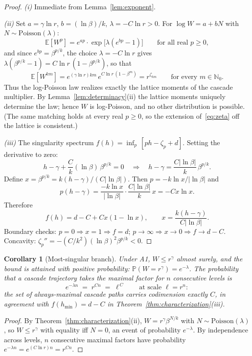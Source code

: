 \documentclass[pdflatex,sn-mathphys-num]{sn-jnl}
\theoremstyle{thmstyleone}
\newtheorem{corollary}[theorem]{Corollary}
\theoremstyle{thmstyletwo}
\theoremstyle{thmstylethree}
\begin{document}
\begin{proof}
\textit{(i)} Immediate from Lemma~\ref{lem:exponent}.

\textit{(ii)} Set $a = \gamma\ln r$, $b = (\ln\beta)/k$, $\lambda =
-C\ln r > 0$.  For $\log W = a + bN$ with $N \sim
\mathrm{Poisson}(\lambda)$:
\[
  \mathbb{E}[W^p] = e^{ap} \cdot \exp\bigl[\lambda(e^{bp} - 1)\bigr]
  \qquad\text{for all real } p \ge 0,
\]
and since $e^{bp} = \beta^{p/k}$, the choice $\lambda = -C\ln r$
gives $\lambda(\beta^{p/k}-1) = C\ln r\,(1-\beta^{p/k})$, so that
\[
  \mathbb{E}[W^{km}]
  = e^{(\gamma\ln r) km}\, e^{C\ln r\,(1-\beta^{m})}
  = r^{\zeta_{km}}
  \qquad\text{for every } m \in \mathbb{N}_0 .
\]
Thus the log-Poisson law realizes exactly the lattice moments of the
cascade multiplier.  By Lemma~\ref{lem:determinacy}(ii) the lattice
moments uniquely determine the law; hence $W$ is log-Poisson, and no
other distribution is possible.  (The same matching holds at every
real $p \ge 0$, so the extension of~\eqref{eq:zeta} off the lattice
is consistent.)

\textit{(iii)}  The singularity spectrum $f(h) = \inf_p\,[ph -
\zeta_p + d]$.  Setting the derivative to zero:
\[
  h - \gamma + \frac{C}{k}(\ln\beta)\,\beta^{p/k} = 0
  \quad\Longrightarrow\quad
  h - \gamma = \frac{C|\ln\beta|}{k}\,\beta^{p/k}.
\]
Define $x = \beta^{p/k} = k(h-\gamma)/(C|\ln\beta|)$.  Then $p =
-k\ln x / |\ln\beta|$ and
\[
  p(h - \gamma) = \frac{-k\ln x}{|\ln\beta|}
    \cdot \frac{C|\ln\beta|}{k}\,x = -Cx\ln x.
\]
Therefore
\[
  f(h) = d - C + Cx(1 - \ln x), \qquad
  x = \frac{k(h-\gamma)}{C|\ln\beta|}.
\]
Boundary checks: $p = 0 \Rightarrow x = 1 \Rightarrow f = d$; $p \to
\infty \Rightarrow x \to 0 \Rightarrow f \to d - C$.  Concavity:
$\zeta_p'' = -(C/k^2)(\ln\beta)^2\beta^{p/k} < 0$.
\end{proof}

\begin{corollary}[Most-singular branch]\label{cor:branch}
Under A1, $W \le r^\gamma$ almost surely, and the bound is attained
with positive probability: $\mathbb{P}(W = r^\gamma) = e^{-\lambda}$.
The probability that a cascade trajectory takes the maximal factor
for $n$ consecutive levels is
\[
  e^{-\lambda n} \;=\; r^{Cn} \;=\; \ell^{\,C}
  \qquad\text{at scale } \ell = r^n :
\]
the set of always-maximal cascade paths carries codimension exactly
$C$, in agreement with $f(h_{\min}) = d - C$ in
Theorem~\textup{\ref{thm:characterization}(iii)}.
\end{corollary}

\begin{proof}
By Theorem~\ref{thm:characterization}(ii), $W = r^\gamma
\beta^{N/k}$ with $N \sim \mathrm{Poisson}(\lambda)$, so $W \le
r^\gamma$ with equality iff $N = 0$, an event of probability
$e^{-\lambda}$.  By independence across levels, $n$ consecutive
maximal factors have probability $e^{-\lambda n} =
e^{(C\ln r) n} = r^{Cn}$.
\end{proof}
\end{document}
